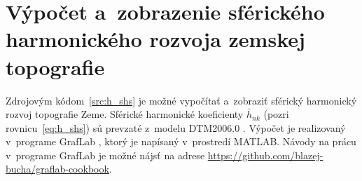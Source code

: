 \documentclass[a4paper, 12pt]{book}
\begin{document}






\chapter{Výpočet a~zobrazenie sférického harmonického rozvoja zemskej
topografie}
\label{app:shs_topography}

Zdrojovým kódom~\ref{src:h_shs} je možné vypočítať a~zobraziť sférický
harmonický rozvoj topografie Zeme.  Sférické harmonické koeficienty
$\bar{h}_{nk}$ (pozri rovnicu~\ref{eq:h_shs}) sú prevzaté z~modelu DTM2006.0
\citep{DTM2006}.  Výpočet je realizovaný v~programe GrafLab \citep{GrafLab},
ktorý je napísaný v~prostredí MATLAB.  Návody na prácu v~programe GrafLab je
možné nájsť na adrese \url{https://github.com/blazej-bucha/graflab-cookbook}.






\end{document}
